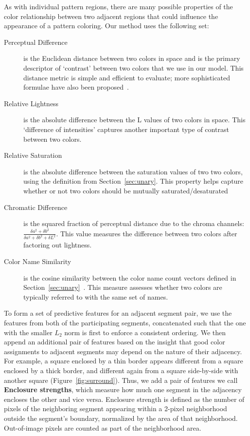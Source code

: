 As with individual pattern regions, there are many possible properties of the color relationship between two adjacent regions that could influence the appearance of a pattern coloring. Our method uses the following set:
\begin{description}
	\item[Perceptual Difference] is the Euclidean distance between two colors in \lab space and is the primary descriptor of `contrast' between two colors that we use in our model. This distance metric is simple and efficient to evaluate; more sophisticated formulae have also been proposed~\cite{CIEDE2000}.
	\item[Relative Lightness] is the absolute difference between the L values of two colors in \lab space. This `difference of intensities' captures another important type of contrast between two colors.
	\item[Relative Saturation] is the absolute difference between the saturation values of two two colors, using the definition from Section~\ref{sec:unary}. This property helps capture whether or not two colors should be mutually saturated/desaturated
	\item[Chromatic Difference] is the squared fraction of perceptual distance due to the \lab chroma channels: $\frac{\delta a^2+\delta b^2}{\delta a^2+\delta b^2+\delta L^2}$. This value measures the difference between two colors after factoring out lightness.
	\item[Color Name Similarity] is the cosine similarity between the color name count vectors defined in Section~\ref{sec:unary}~\cite{ColorNamingModels}. This measure assesses whether two colors are typically referred to with the same set of names.
\end{description}
To form a set of predictive features for an adjacent segment pair, we use the features from both of the participating segments, concatenated such that the one with the smaller $L_2$ norm is first to enforce a consistent ordering. We then append an additional pair of features based on the insight that good color assignments to adjacent segments may depend on the nature of their adjacency. For example, a square enclosed by a thin border appears different from a square enclosed by a thick border, and different again from a square side-by-side with another square (Figure~\ref{fig:surround}). Thus, we add a pair of features we call \textbf{Enclosure strengths}, which measure how much one segment in the adjacency encloses the other and vice versa. Enclosure strength is defined as the number of pixels of the neighboring segment appearing within a 2-pixel neighborhood outside the segment's boundary, normalized by the area of that neighborhood. Out-of-image pixels are counted as part of the neighborhood area.

